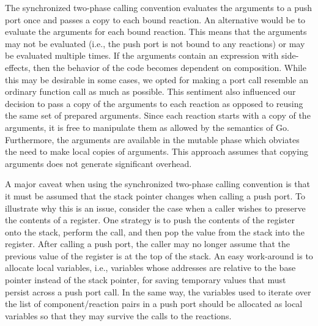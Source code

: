 The synchronized two-phase calling convention evaluates the arguments to a push port once and passes a copy to each bound reaction.
An alternative would be to evaluate the arguments for each bound reaction.
This means that the arguments may not be evaluated (i.e., the push port is not bound to any reactions) or may be evaluated multiple times.
If the arguments contain an expression with side-effects, then the behavior of the code becomes dependent on composition.
While this may be desirable in some cases, we opted for making a port call resemble an ordinary function call as much as possible.
This sentiment also influenced our decision to pass a copy of the arguments to each reaction as opposed to reusing the same set of prepared arguments.
Since each reaction starts with a copy of the arguments, it is free to manipulate them as allowed by the semantics of Go.
Furthermore, the arguments are available in the mutable phase which obviates the need to make local copies of arguments.
This approach assumes that copying arguments does not generate significant overhead.


A major caveat when using the synchronized two-phase calling convention is that it must be assumed that the stack pointer changes when calling a push port.
To illustrate why this is an issue, consider the case when a caller wishes to preserve the contents of a register.
One strategy is to push the contents of the register onto the stack, perform the call, and then pop the value from the stack into the register.
After calling a push port, the caller may no longer assume that the previous value of the register is at the top of the stack.
An easy work-around is to allocate local variables, i.e., variables whose addresses are relative to the base pointer instead of the stack pointer, for saving temporary values that must persist across a push port call.
In the same way, the variables used to iterate over the list of component/reaction pairs in a push port should be allocated as local variables so that they may survive the calls to the reactions.


